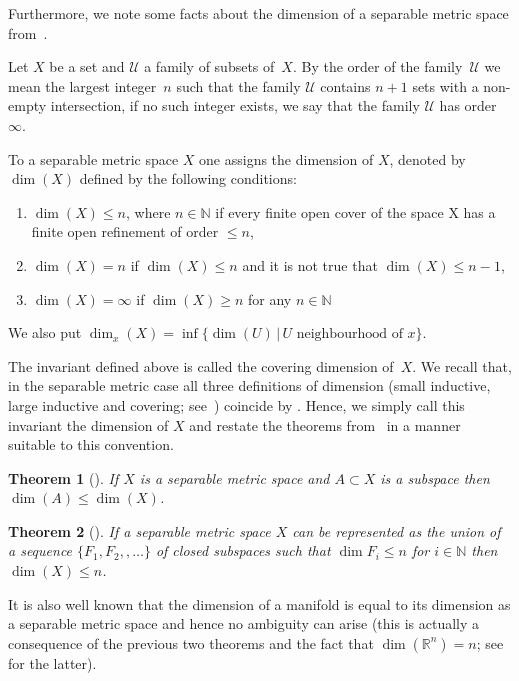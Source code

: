 \documentclass[11pt]{article}
\newtheorem{tw}{Theorem}[section]
\begin{document}
Furthermore, we note some facts about the dimension of a separable metric space from~\cite{E}.
\begin{defi} Let $X$ be a set and $\mathcal{U}$ a family of subsets of~$X$. By the order of the family~$\mathcal{U}$ we mean the largest integer~$n$ such that the family $\mathcal{U}$ contains $n+ 1$ sets with a non-empty intersection, if no such integer exists, we say that the family $\mathcal{U}$ has order $\infty$.
\end{defi}
\begin{defi} To a separable metric space $X$ one assigns the dimension of $X$, denoted by $\dim(X)$ defined by the following conditions:
\begin{enumerate}\itemsep=0pt
\item[1)] $\dim(X) \leq n$, where $n\in\mathbb{N}$ if every finite open cover of the space X has a finite open refinement of order $\leq n$,
\item[2)] $\dim(X)=n$ if $\dim(X) \leq n$ and it is not true that $\dim(X) \leq n- 1$,
\item[3)] $\dim(X)=\infty$ if $\dim(X)\geq n$ for any $n\in\mathbb{N}$
\end{enumerate}
We also put $\dim_x(X)=\inf\{\dim(U) \,|\, U \text{ neighbourhood of } x\}$.
\end{defi}
\begin{rem} The invariant defined above is called the covering dimension of~$X$. We recall that, in the separable metric case all three definitions of dimension (small inductive, large inductive and covering; see~\cite{E}) coincide by \cite[Theorem~1.7.7]{E}. Hence, we simply call this invariant the dimension of $X$ and restate the theorems from~\cite{E} in a manner suitable to this convention.
\end{rem}
\begin{tw}[{\cite[Theorem~1.1.2]{E}}] If $X$ is a separable metric space and $A\subset X$ is a subspace then $\dim(A)\leq \dim(X)$.
\end{tw}
\begin{tw}[{\cite[Theorem~1.5.3]{E}\label{DCS}}] If a separable metric space $X$ can be represented as the union of a sequence $\{F_1, F_2,, \dots\}$ of closed subspaces such that $\dim{F_i}\leq n$ for $i\in\mathbb{N}$ then $\dim(X) \leq n$.
\end{tw}

It is also well known that the dimension of a manifold is equal to its dimension as a separable metric space and hence no ambiguity can arise (this is actually a consequence of the previous two theorems and the fact that $\dim(\mathbb{R}^n)=n$; see \cite[Theorem~1.8.2]{E} for the latter).
\end{document}
